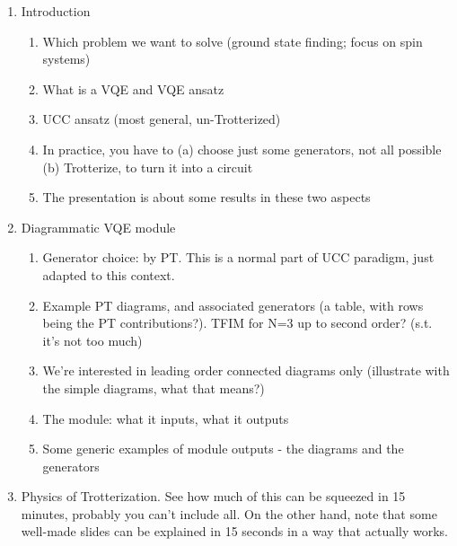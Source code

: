 \documentclass[10pt, a4paper]{article}
\begin{document}
\begin{enumerate}
\item Introduction
\begin{enumerate}
	\item Which problem we want to solve (ground state finding; focus on spin systems)
	\item What is a VQE and VQE ansatz
	\item UCC ansatz (most general, un-Trotterized)
	\item In practice, you have to (a) choose just some generators, not all possible (b) Trotterize, to turn it into a circuit
	\item The presentation is about some results in these two aspects
\end{enumerate}

\item Diagrammatic VQE module

\begin{enumerate}
	\item Generator choice: by PT. This is a normal part of UCC paradigm, just adapted to this context.
	\item Example PT diagrams, and associated generators (a table, with rows being the PT contributions?). TFIM for N=3 up to second order? (s.t. it's not too much)
	\item We're interested in leading order connected diagrams only (illustrate with the simple diagrams, what that means?)
	\item The module: what it inputs, what it outputs
	\item Some generic examples of module outputs - the diagrams and the generators
\end{enumerate}

\item Physics of Trotterization. See how much of this can be squeezed in 15 minutes, probably you can't include all. On the other hand, note that some well-made slides can be explained in 15 seconds in a way that actually works.


\end{enumerate}
\end{document}

